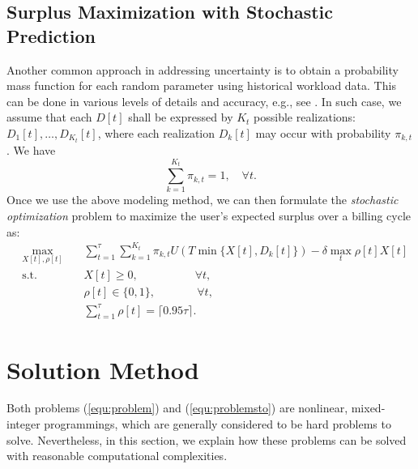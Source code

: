 \documentclass[10pt,journal,compsoc]{IEEEtran}
\begin{document}
\subsection{Surplus Maximization with Stochastic Prediction}\label{subsec:sto}
Another common approach in addressing uncertainty is to obtain a probability mass function \cite{probabilitymassfunction} for each random parameter using historical workload data. This can be done in various levels of details and accuracy, e.g., see \cite{Jedynak2005}. 
In such case, we assume that each $D[t]$ shall be expressed by  $K_{t}$ possible realizations: $D_{1}[t],\ldots,D_{K_{t}}[t]$, where each realization $D_{k}[t]$ may occur with probability $\pi_{k,t}$. We have
\begin{equation}\label{equ:simplefunction}
\sum_{k=1}^{K_{t}} \pi_{k,t}=1, \quad \forall t.
\end{equation}
Once we use the above modeling method, we can then formulate the \emph{stochastic optimization} problem to maximize the user's expected surplus over a billing cycle as:
\begin{equation}\label{equ:problemsto}
\begin{aligned}
& \underset{X[t],\rho[t]}{\text{max}} \!\!\!\!\!\!\
& &  \sum_{t=1}^{\tau} {\sum_{k=1}^{K_{t}} {\pi_{k,t} U(T\min\{X[t],D_k[t]\})}}-\delta \max_{t}\rho[t]X[t]\\
& \text{s.t.} & & X[t]\geq 0, \quad \quad \quad \quad \quad \forall t, \\
&&& \rho[t] \in \{0,1\}, \quad\quad\quad\ \ \:\! \forall t, \\
&&& \sum_{t=1}^{\tau} {\rho[t]}=\lceil0.95\tau\rceil.
\end{aligned}
\end{equation}


\vspace{-0.1cm}







\section{Solution Method}

Both problems (\ref{equ:problem}) and (\ref{equ:problemsto}) are nonlinear, mixed-integer programmings, which are generally considered to be hard problems to solve. Nevertheless, in this section, we explain how these problems can be solved with reasonable computational complexities.
\end{document}

